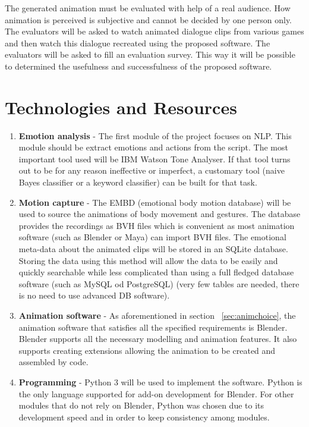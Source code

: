 The generated animation must be evaluated with help of a real audience. How animation is perceived is subjective and cannot be decided by one person only. The evaluators will be asked to watch animated dialogue clips from various games and then watch this dialogue recreated using the proposed software. The evaluators will be asked to fill an evaluation survey. This way it will be possible to determined the usefulness and successfulness of the proposed software.


\section{Technologies and Resources}

\begin{enumerate}
\item \textbf{Emotion analysis} - The first module of the project focuses on NLP. This module should be extract emotions and actions from the script. The most important tool used will be IBM Watson Tone Analyser. If that tool turns out to be for any reason ineffective or imperfect, a customary tool (naive Bayes classifier or a keyword classifier) can be built for that task.

\item \textbf{Motion capture} - The EMBD (emotional body motion database) will be used to source the animations of body movement and gestures. The database provides the recordings as BVH files which is convenient as most animation software (such as Blender or Maya) can import BVH files. The emotional meta-data about the animated clips will be stored in an SQLite database. Storing the data using this method will allow the data to be easily and quickly searchable while less complicated than using a full fledged database software (such as MySQL od PostgreSQL) (very few tables are needed, there is no need to use advanced DB software).

\item \textbf{Animation software} - As aforementioned in section ~\ref{sec:animchoice}, the animation software that satisfies all the specified requirements is Blender. Blender supports all the necessary modelling and animation features. It also supports creating extensions allowing the animation to be created and assembled by code.

\item \textbf{Programming} - Python 3 will be used to implement the software. Python is the only language supported for add-on development for Blender. For other modules that do not rely on Blender, Python was chosen due to its development speed and in order to keep consistency among modules.

\end{enumerate}

